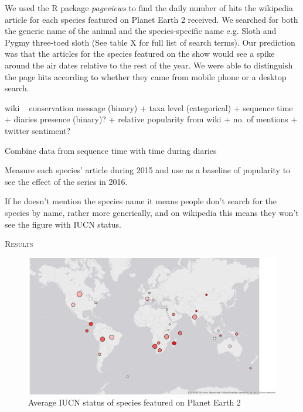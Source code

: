\documentclass[12pt,letterpaper]{article}
\renewcommand{\section}[1]{%
\bigskip
\begin{center}
\begin{Large}
\normalfont\scshape #1
\medskip
\end{Large}
\end{center}}
\begin{document}
We used the R package \textit{pageviews} to find the daily number of hits the wikipedia article for each species featured on Planet Earth 2 received. We searched for both the generic name of the animal and the species-specific name e.g. Sloth and Pygmy three-toed sloth (See table X for full list of search terms). Our prediction was that the articles for the species featured on the show would see a spike around the air dates relative to the rest of the year. We were able to distinguish the page hits according to whether they came from mobile phone or a desktop search.  

wiki ~ conservation message (binary) + taxa level (categorical) + sequence time + diaries presence (binary)? + relative popularity from wiki + no. of mentions + twitter sentiment?

Combine data from sequence time with time during diaries

Measure each species' article during 2015 and use as a baseline of popularity to see the effect of the series in 2016.

If he doesn't mention the species name it means people don't search for the species by name, rather more generically, and on wikipedia this means they won't see the figure with IUCN status. 

%
%


\section{Results}

\begin{figure}[H]
\centering
    \includegraphics[keepaspectratio, totalheight=0.5 \textheight]{map2.jpg}
\caption{Average IUCN status of species featured on Planet Earth 2}
\label{info.diff}
\end{figure}
\end{document}

